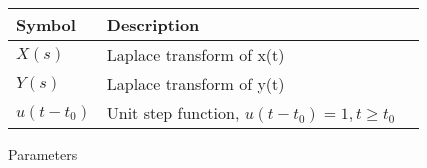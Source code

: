 \setlength{\arrayrulewidth}{0.3mm}
\setlength{\tabcolsep}{15pt}
\renewcommand{\arraystretch}{1.5}



\begin{tabular}{ |p{1cm}|p{3cm}|p{1cm}| }
\hline
Symbol & Description\\
\hline
$X(s)$ & Laplace transform of x(t)\\
\hline
$Y(s)$ & Laplace transform of y(t) \\
\hline
$u(t-t_0)$ & Unit step function, $u(t-t_0) = 1, t \geq t_0$\\
\hline
\end{tabular}
\caption{Parameters}
